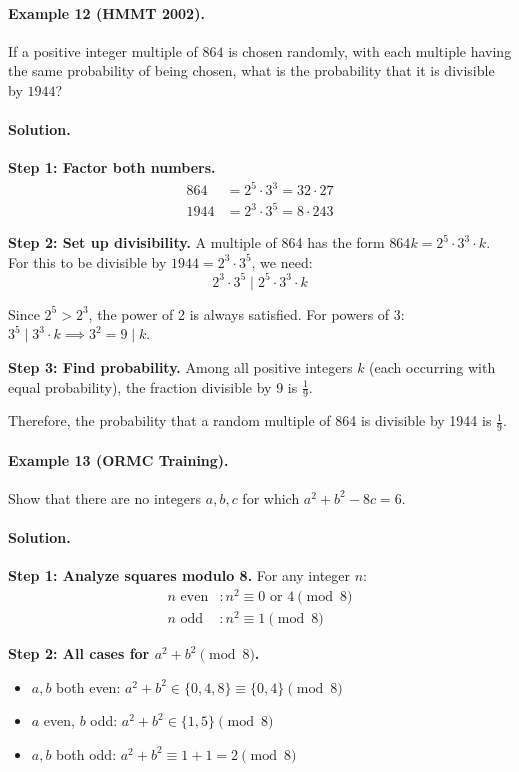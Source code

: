 \documentclass[12pt]{extarticle}
\begin{document}
\paragraph{Example 12 (HMMT 2002).} If a positive integer multiple of $864$ is chosen randomly, with each multiple having the same probability of being chosen, what is the probability that it is divisible by $1944$?

\paragraph{Solution.}
\textbf{Step 1: Factor both numbers.}
\begin{align*}
864 &= 2^5 \cdot 3^3 = 32 \cdot 27\\
1944 &= 2^3 \cdot 3^5 = 8 \cdot 243
\end{align*}

\textbf{Step 2: Set up divisibility.} A multiple of 864 has the form $864k = 2^5 \cdot 3^3 \cdot k$. For this to be divisible by $1944 = 2^3 \cdot 3^5$, we need:
\[
2^3 \cdot 3^5 \mid 2^5 \cdot 3^3 \cdot k
\]

Since $2^5 > 2^3$, the power of 2 is always satisfied. For powers of 3: $3^5 \mid 3^3 \cdot k \implies 3^2 = 9 \mid k$.

\textbf{Step 3: Find probability.} Among all positive integers $k$ (each occurring with equal probability), the fraction divisible by 9 is $\frac{1}{9}$.

Therefore, the probability that a random multiple of 864 is divisible by 1944 is $\boxed{\frac{1}{9}}$.

\paragraph{Example 13 (ORMC Training).} Show that there are no integers $a, b, c$ for which $a^2 + b^2 - 8c = 6$.

\paragraph{Solution.}
\textbf{Step 1: Analyze squares modulo 8.} For any integer $n$:
\begin{align*}
n \text{ even} &: n^2 \equiv 0 \text{ or } 4 \pmod{8}\\
n \text{ odd} &: n^2 \equiv 1 \pmod{8}
\end{align*}

\textbf{Step 2: All cases for $a^2 + b^2 \pmod{8}$.}
\begin{itemize}
    \item $a, b$ both even: $a^2 + b^2 \in \{0, 4, 8\} \equiv \{0, 4\} \pmod{8}$
    \item $a$ even, $b$ odd: $a^2 + b^2 \in \{1, 5\} \pmod{8}$
    \item $a, b$ both odd: $a^2 + b^2 \equiv 1 + 1 = 2 \pmod{8}$
\end{itemize}
\end{document}
